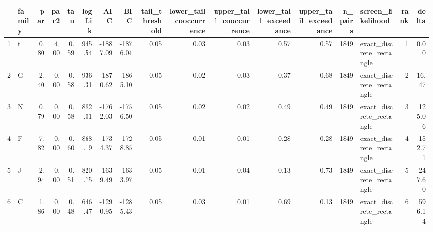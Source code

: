 \begin{table}[ht]
\centering
\begin{tabular}{rlrrrrrrrrrrrrlrr}
  \hline
 & family & par & par2 & tau & logLik & AIC & BIC & tail\_threshold & lower\_tail\_cooccurrence & upper\_tail\_cooccurrence & lower\_tail\_exceedance & upper\_tail\_exceedance & n\_pairs & screen\_likelihood & rank & delta \\ 
  \hline
1 & t & 0.80 & 4.00 & 0.59 & 945.54 & -1887.09 & -1876.04 & 0.05 & 0.03 & 0.03 & 0.57 & 0.57 & 1849 & exact\_discrete\_rectangle &   1 & 0.00 \\ 
  2 & G & 2.40 & 0.00 & 0.58 & 936.31 & -1870.62 & -1865.10 & 0.05 & 0.02 & 0.03 & 0.37 & 0.68 & 1849 & exact\_discrete\_rectangle &   2 & 16.47 \\ 
  3 & N & 0.79 & 0.00 & 0.58 & 882.01 & -1762.03 & -1756.50 & 0.05 & 0.02 & 0.02 & 0.49 & 0.49 & 1849 & exact\_discrete\_rectangle &   3 & 125.06 \\ 
  4 & F & 7.82 & 0.00 & 0.60 & 868.19 & -1734.37 & -1728.85 & 0.05 & 0.01 & 0.01 & 0.28 & 0.28 & 1849 & exact\_discrete\_rectangle &   4 & 152.71 \\ 
  5 & J & 2.94 & 0.00 & 0.51 & 820.75 & -1639.49 & -1633.97 & 0.05 & 0.01 & 0.04 & 0.13 & 0.73 & 1849 & exact\_discrete\_rectangle &   5 & 247.60 \\ 
  6 & C & 1.86 & 0.00 & 0.48 & 646.47 & -1290.95 & -1285.43 & 0.05 & 0.03 & 0.01 & 0.69 & 0.13 & 1849 & exact\_discrete\_rectangle &   6 & 596.14 \\ 
   \hline
\end{tabular}
\end{table}
